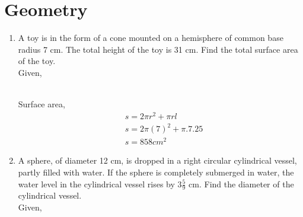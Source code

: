 \documentclass[journal,12pt,twocolumn]{IEEEtran}
\renewcommand\thesection{\arabic{section}}
\begin{document}
\section{Geometry}
\renewcommand{\theequation}{\theenumi}
\begin{enumerate}[label=\thesection.\arabic*.,ref=\thesection.\theenumi]
\item A toy is in the form of a cone mounted on a hemisphere of common base radius 7 cm. The total height of the toy is 31 cm. Find the total surface area of the toy.\\
\solution
Given, \\
\begin{table}[ht]
 \centering
 \caption{}
 \end{table} \\
Surface area,
\begin{align}
&s = 2\pi r^2 + \pi r l \\
&s = 2 \pi (7)^2 + \pi.7.25 \\
& s = 858 cm^2
\end{align}
\item A sphere, of diameter 12 cm, is dropped in
a right circular cylindrical vessel, partly filled
with water. If the sphere is completely submerged
in water, the water level in the cylindrical
vessel rises by $3\displaystyle\frac{5}{9}$
cm. Find the diameter
of the cylindrical vessel.\\
\solution
Given, \\ 
\begin{table}[ht]
 \centering
\end{table}
\end{enumerate}
\end{document}
